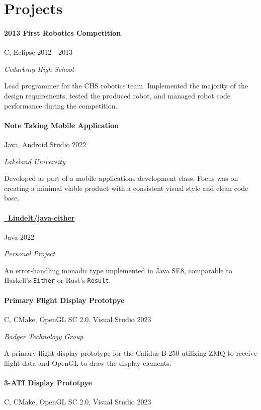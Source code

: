 \documentclass[10pt]{article}
\newcommand{\Rplus}{\protect\raisebox{0.35ex}{\smaller{\smaller{\textbf{+}}}}}
\newcommand{\Cpp}{\mbox{C\Rplus\Rplus}}
\newcommand{\firstpar}{\vspace{4pt}\noindent}
\begin{document}
\section*{Projects}
\paragraph{2013 First Robotics Competition}
\vline\quad \Cpp, Eclipse \hfill 2012---2013

\noindent
\textit{Cedarburg High School}

\firstpar
Lead programmer for the CHS robotics team. Implemented the majority of the design
requirements, tested the produced robot, and managed robot code performance during
the competition.

\paragraph{Note Taking Mobile Application}
\vline\quad Java, Android Studio \hfill 2022

\noindent
\textit{Lakeland University}

\firstpar
Developed as part of a mobile applications development class. Focus was on creating a minimal
viable product with a consistent visual style and clean code base.

\paragraph{\href{https://github.com/Lindelt/java-either}{\faGithub\ Lindelt/java-either}}
\vline\quad Java \hfill 2022

\noindent
\textit{Personal Project}

\firstpar
An error-handling monadic type implemented in Java SE8, comparable to Haskell's \texttt{Either} or
Rust's \texttt{Result}.

\paragraph{Primary Flight Display Prototpye}
\vline\quad \Cpp, CMake, OpenGL SC 2.0, Visual Studio \hfill 2023

\noindent
\textit{Badger Technology Group}

\firstpar
A primary flight display prototype for the Calidus B-250 utilizing ZMQ to receive flight data
and OpenGL to draw the display elements.

\paragraph{3-ATI Display Prototpye}
\vline\quad \Cpp, CMake, OpenGL SC 2.0, Visual Studio \hfill 2023
\end{document}
